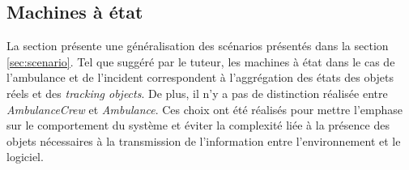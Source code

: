 \subsection{Machines à état}
\label{sec:MachineAEtat}

	La section présente une généralisation des scénarios présentés dans la
	section \ref{sec:scenario}.   Tel que suggéré par le tuteur,  les machines
	à état dans le cas de l'ambulance et de l'incident correspondent à
	l'aggrégation des états des objets réels et des \textit{tracking objects}.
	De plus, il n'y a pas de distinction réalisée entre \textit{AmbulanceCrew}
	et \textit{Ambulance}.  Ces choix ont été réalisés pour mettre l'emphase
	sur le comportement du système et éviter la complexité liée à la présence
	des objets nécessaires à la transmission de l'information entre
	l'environnement et le logiciel.
 	

